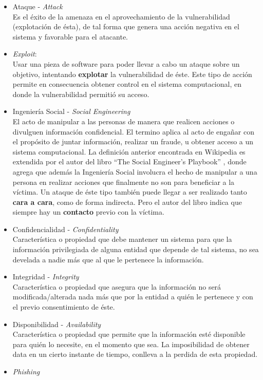 \begin{itemize}
	\item Ataque - \textit{Attack}
		\\Es el éxito de la amenaza en el aprovechamiento de la vulnerabilidad (explotación de ésta), de tal forma que genera una acción negativa en el sistema y favorable para el atacante.
	\item \textit{Exploit}:
		\\Usar una pieza de software para poder llevar a cabo un ataque sobre un objetivo, intentando \textbf{explotar} la vulnerabilidad de éste. Este tipo de acción permite en consecuencia obtener control en el sistema computacional, en donde la vulnerabilidad permitió su acceso.
	\item Ingeniería Social - \textit{Social Engineering}
		\\El acto de manipular a las personas de manera que realicen acciones o divulguen información confidencial. El termino aplica al acto de engañar con el propósito de juntar información, realizar un fraude, u obtener acceso a un sistema computacional. La definición anterior encontrada en Wikipedia es extendida por el autor del libro ``The Social Engineer's Playbook'' \cite{socEngineeering}, donde agrega que además la Ingeniería Social involucra el hecho de manipular a una persona en realizar acciones que finalmente no son para beneficiar a la víctima. Un ataque de éste tipo también puede llegar a ser realizado tanto \textbf{cara a cara}, como de forma indirecta. Pero el autor del libro indica que siempre hay un \textbf{contacto} previo con la víctima.
	\item Confidencialidad - \textit{Confidentiality} 
		\\Característica o propiedad que debe mantener un sistema para que la información privilegiada de alguna entidad que depende de tal sistema, no sea develada a nadie más que al que le pertenece la información.
	\item Integridad - \textit{Integrity}
		\\Característica o propiedad que asegura que la información no será modificada/alterada nada más que por la entidad a quién le pertenece y con el previo consentimiento de éste.
	\item Disponibilidad - \textit{Availability}
		\\Característica o propiedad que permite que la información esté disponible para quién lo necesite, en el momento que sea. La imposibilidad de obtener data en un cierto instante de tiempo, conlleva a la perdida de esta propiedad.
	\item \textit{Phishing}

\end{itemize}
